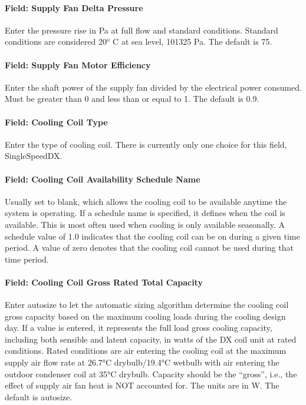 \paragraph{Field: Supply Fan Delta Pressure}\label{field-supply-fan-delta-pressure}

Enter the pressure rise in Pa at full flow and standard conditions. Standard conditions are considered 20\(^{o}\) C at sea level, 101325 Pa. The default is 75.

\paragraph{Field: Supply Fan Motor Efficiency}\label{field-supply-fan-motor-efficiency-1}

Enter the shaft power of the supply fan divided by the electrical power consumed. Must be greater than 0 and less than or equal to 1. The default is 0.9.

\paragraph{Field: Cooling Coil Type}\label{field-cooling-coil-type-1}

Enter the type of cooling coil. There is currently only one choice for this field, SingleSpeedDX.

\paragraph{Field: Cooling Coil Availability Schedule Name}\label{field-cooling-coil-availability-schedule-name-1}

Usually set to blank, which allows the cooling coil to be available anytime the system is operating. If a schedule name is specified, it defines when the coil is available. This is most often used when cooling is only available seasonally. A schedule value of 1.0 indicates that the cooling coil can be on during a given time period. A value of zero denotes that the cooling coil cannot be used during that time period.

\paragraph{Field: Cooling Coil Gross Rated Total Capacity}\label{field-cooling-coil-gross-rated-total-capacity}

Enter autosize to let the automatic sizing algorithm determine the cooling coil gross capacity based on the maximum cooling loads during the cooling design day. If a value is entered, it represents the full load gross cooling capacity, including both sensible and latent capacity, in watts of the DX coil unit at rated conditions. Rated conditions are air entering the cooling coil at the maximum supply air flow rate at 26.7°C drybulb/19.4°C wetbulb with air entering the outdoor condenser coil at 35°C drybulb. Capacity should be the ``gross'', i.e., the effect of supply air fan heat is NOT accounted for. The units are in W. The default is autosize.

